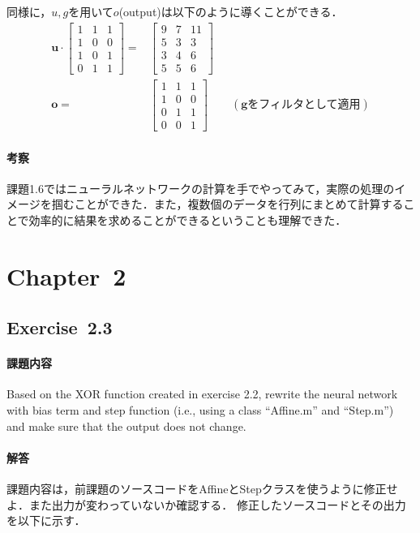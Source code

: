 \documentclass[11pt, a4paper]{jsarticle}
\begin{document}
  同様に，$ u, g $を用いて$ o $(output)は以下のように導くことができる．
  \begin{align*}
    {\bm u} \cdot \begin{bmatrix}1&1&1\\1&0&0\\1&0&1\\0&1&1\end{bmatrix} =& \begin{bmatrix}9&7&11\\5&3&3\\3&4&6\\5&5&6\end{bmatrix} \\
    {\bm o} =& \begin{bmatrix}1&1&1\\1&0&0\\0&1&1\\0&0&1\end{bmatrix} \qquad ({\bm g}\text{をフィルタとして適用})
  \end{align*}

  \paragraph{ 考察}
  課題1.6ではニューラルネットワークの計算を手でやってみて，実際の処理のイメージを掴むことができた．また，複数個のデータを行列にまとめて計算することで効率的に結果を求めることができるということも理解できた．

  \section{Chapter~2}
  \subsection{Exercise~2.3}
  \paragraph{ 課題内容}
  Based on the XOR function created in exercise 2.2, rewrite the neural network with bias term and step function (i.e., using a class “Affine.m” and “Step.m”) and make sure that the output does not change.

  \paragraph{ 解答}
  課題内容は，前課題のソースコードをAffineとStepクラスを使うように修正せよ．また出力が変わっていないか確認する．
  修正したソースコードとその出力を以下に示す．
\end{document}
